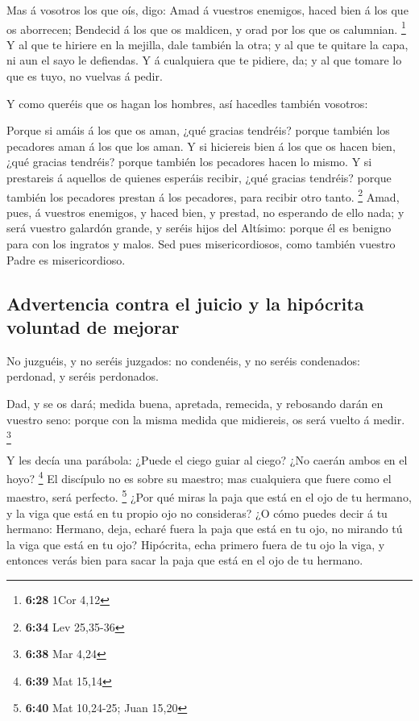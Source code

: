  Mas á vosotros los que oís, digo: Amad á vuestros
enemigos, haced bien á los que os aborrecen;  Bendecid á
los que os maldicen, y orad por los que os calumnian. \footnote{\textbf{6:28}
  1Cor 4,12}  Y al que te hiriere en la mejilla, dale
también la otra; y al que te quitare la capa, ni aun el sayo le
defiendas.  Y á cualquiera que te pidiere, da; y al que
tomare lo que es tuyo, no vuelvas á pedir.

 Y como queréis que os hagan los hombres, así hacedles
también vosotros:

 Porque si amáis á los que os aman, ¿qué gracias tendréis?
porque también los pecadores aman á los que los aman.  Y si
hiciereis bien á los que os hacen bien, ¿qué gracias tendréis? porque
también los pecadores hacen lo mismo.  Y si prestareis á
aquellos de quienes esperáis recibir, ¿qué gracias tendréis? porque
también los pecadores prestan á los pecadores, para recibir otro tanto.
\footnote{\textbf{6:34} Lev 25,35-36}  Amad, pues, á
vuestros enemigos, y haced bien, y prestad, no esperando de ello nada; y
será vuestro galardón grande, y seréis hijos del Altísimo: porque él es
benigno para con los ingratos y malos.  Sed pues
misericordiosos, como también vuestro Padre es misericordioso.

\hypertarget{advertencia-contra-el-juicio-y-la-hipuxf3crita-voluntad-de-mejorar}{%
\subsection{Advertencia contra el juicio y la hipócrita voluntad de
mejorar}\label{advertencia-contra-el-juicio-y-la-hipuxf3crita-voluntad-de-mejorar}}

 No juzguéis, y no seréis juzgados: no condenéis, y no
seréis condenados: perdonad, y seréis perdonados.

 Dad, y se os dará; medida buena, apretada, remecida, y
rebosando darán en vuestro seno: porque con la misma medida que
midiereis, os será vuelto á medir. \footnote{\textbf{6:38} Mar 4,24}

 Y les decía una parábola: ¿Puede el ciego guiar al ciego?
¿No caerán ambos en el hoyo? \footnote{\textbf{6:39} Mat 15,14}
 El discípulo no es sobre su maestro; mas cualquiera que
fuere como el maestro, será perfecto. \footnote{\textbf{6:40} Mat
  10,24-25; Juan 15,20}  ¿Por qué miras la paja que está en
el ojo de tu hermano, y la viga que está en tu propio ojo no consideras?
 ¿O cómo puedes decir á tu hermano: Hermano, deja, echaré
fuera la paja que está en tu ojo, no mirando tú la viga que está en tu
ojo? Hipócrita, echa primero fuera de tu ojo la viga, y entonces verás
bien para sacar la paja que está en el ojo de tu hermano.

